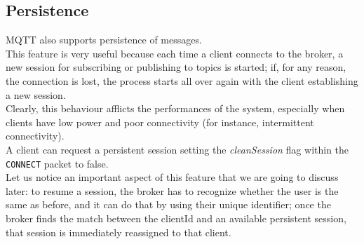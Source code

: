 \documentclass[12pt]{report}
\begin{document}
{\subsection{Persistence}
\label{ssec:mqttpersistence}
\bigskip
MQTT also supports persistence of messages.\\
This feature is very useful because each time a client connects to the broker, a new session for subscribing or publishing to topics is started; if, for any reason, the connection is lost, the process starts all over again with the client establishing a new session.\\
Clearly, this behaviour afflicts the performances of the system, especially when clients have low power and poor connectivity (for instance, intermittent connectivity).\\
A client can request a persistent session setting the \emph{cleanSession} flag within the \texttt{CONNECT} packet to false.\\
Let us notice an important aspect of this feature that we are going to discuss later: to resume a session, the broker has to recognize whether the user is the same as before, and it can do that by using their unique identifier; once the broker finds the match between the clientId and an available persistent session, that session is immediately reassigned to that client.\\

}
\end{document}

